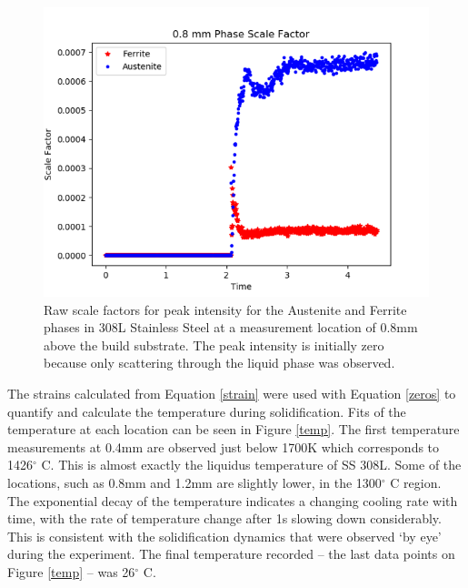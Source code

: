 \documentclass[twocolumn,nofootinbib,notitlepage,aps]{revtex4-1}
\begin{document}
 
\begin{figure}
	\includegraphics[width=1\linewidth]{raw_scale_factors}
	\caption{Raw scale factors for peak intensity for the Austenite and Ferrite phases in 308L Stainless Steel at a measurement location of 0.8mm above the build substrate. The peak intensity is initially zero because only scattering through the liquid phase was observed.}
	\label{scale}
\end{figure}

The strains calculated from Equation \ref{strain} were used with Equation \ref{zeros} to quantify and calculate the temperature during solidification. Fits of the temperature at each location can be seen in Figure \ref{temp}. The first temperature measurements at 0.4mm are observed just below 1700K which corresponds to 1426$^\circ$ C. This is almost exactly the liquidus temperature of SS 308L. Some of the locations, such as 0.8mm and 1.2mm are slightly lower, in the 1300$^\circ$ C region. The exponential decay of the temperature indicates a changing cooling rate with time, with the rate of temperature change after 1s slowing down considerably. This is consistent with the solidification dynamics that were observed `by eye' during the experiment. The final temperature recorded -- the last data points on Figure \ref{temp} -- was 26$^\circ$ C. 
\end{document}
